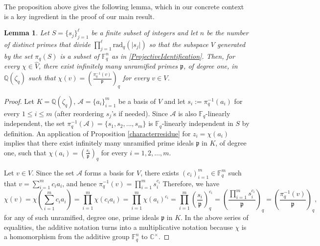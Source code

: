 \documentclass[12pt]{amsart}
\newtheorem{lemma}[theorem]{Lemma}
\begin{document}
The proposition above gives the following lemma, which in our concrete context is a key ingredient in the proof of our main result. 

\begin{lemma}
\label{characterlemma}
Let $S = \{s_{j}\}_{j=1}^{\ell}$ be a finite subset of integers and let $n$ be the number of distinct primes that divide $\prod_{j=1}^{\ell} \text{rad}_{q}(\lvert s_{j} \rvert)$ so that the subspace $V$ generated by the set $\pi_{q}(S)$ is a subset of $\mathbb{F}_{q}^{n}$ as in \ref{ProjectiveIdentification}. Then, for every $\chi\in\hat{V}$, there exist infinitely many unramified primes $\mathfrak{p}$, of degree one, in $\mathbb{Q}(\zeta_{q})$ such that $\chi(v) = \left(\frac{\pi_{q}^{-1}(v)}{\mathfrak{p}}\right)_{q}$ for every $v \in V$. 
\end{lemma}

\begin{proof}
Let $K = \mathbb{Q}(\zeta_{q})$, $\mathcal{A} = \{a_{i}\}_{i=1}^{m}$ be a basis of $V$ and let $s_{i} := \pi_{q}^{-1}(a_{i})$ for every $1 \leq i \leq m$ (after reordering $s_{j}$'s if needed). Since $\mathcal{A}$ is also $\mathbb{F}_{q}$-linearly independent, the set $\pi_{q}^{-1}(\mathcal{A}) = \{s_{1}, s_{2}, \ldots, s_{m}\}$ is $\mathbb{F}_{q}$-linearly independent in $S$ by definition. An application of Proposition \ref{characterresidue} for $z_{i} = \chi(a_{i})$ implies that there exist infinitely many unramified prime ideals $\mathfrak{p}$ in $K$, of degree one, such that $\chi(a_{i}) = \left( \frac{s_{i}}{\mathfrak{p}} \right)_{q}$ for every $i = 1, 2, \ldots, m$.  

Let $v \in V$. Since the set $\mathcal{A}$ forms a basis for $V$, there exists $(c_{i})_{i=1}^{m} \in\mathbb{F}_{q}^{m}$ such that $v = \sum_{i=1}^{m} c_{i} a_{i}$, and hence $\pi_{q}^{-1}(v) = \prod_{i=1}^{m} s_{i}^{c_{i}}$ Therefore, we have
\begin{equation*}
     \chi(v) = \chi \left( \sum_{i=1}^{m} c_{i} a_{i} \right) =  \prod_{i=1}^{m} \chi ( c_{i} a_{i} )  = \prod_{i=1}^{m}  \chi (  a_{i} )^{c_{i}}  = \prod_{i=1}^{m} \left(\frac{s_{i}}{\mathfrak{p}}\right)^{c_{i}}_{q} = \left( \frac{\prod_{i=1}^{m} s_{i}^{c_{i}}}{\mathfrak{p}}\right)_{q} = \left( \frac{\pi_{q}^{-1}(v)}{\mathfrak{p}} \right)_{q},  
\end{equation*}
for any of such unramified, degree one, prime ideals $\mathfrak{p}$ in $K$. In the above series of equalities, the additive notation turns into a multiplicative notation because $\chi$ is a homomorphism from the additive group $\mathbb{F}_{q}^{n}$ to $\mathbb{C}^{\times}$.
\end{proof}
\end{document}
